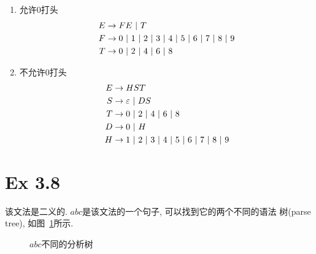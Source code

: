 \begin{solve}
  \begin{enumerate}
  \item 允许0打头
    \begin{align*}
      E &\rightarrow FE \ |\ {} T\\
      F &\rightarrow 0 \ |\ {} 1 \ |\ {} 2 \ |\ {} 3 \ |\ {} 4 \ |\ {} 5 \ |\ {} 6 \ |\ {} 7 \ |\ {} 8 \ |\ {} 9\\
      T &\rightarrow 0 \ |\ {} 2 \ |\ {} 4 \ |\ {} 6 \ |\ {} 8
    \end{align*}
    
  \item 不允许0打头
    \begin{align*}
      E & \rightarrow HST\\
      S & \rightarrow \varepsilon \ |\ {} DS \\
      T & \rightarrow 0 \ |\ {} 2 \ |\ {} 4 \ |\ {} 6 \ |\ {} 8\\
      D & \rightarrow 0 \ |\ {} H\\
      H & \rightarrow 1 \ |\ {} 2 \ |\ {} 3 \ |\ {} 4 \ |\ {} 5 \ |\ {} 6 \ |\ {} 7 \ |\ {} 8 \ |\ {} 9
    \end{align*}
  \end{enumerate}
\end{solve}

\section{Ex 3.8}
\begin{solve}
  该文法是二义的. $abc$是该文法的一个句子, 可以找到它的两个不同的语法
  树(parse tree), 如图~\ref{fig:abc-parse}所示.

  \begin{figure}[hb]
    \begin{center}
      \begin{minipage}[c]{0.5\textwidth}
        \centering
      \end{minipage}%
      \begin{minipage}[c]{0.5\textwidth}
        \centering
      \end{minipage}
      \caption{$abc$不同的分析树}
      \label{fig:abc-parse}
    \end{center}
  \end{figure}
\end{solve}

